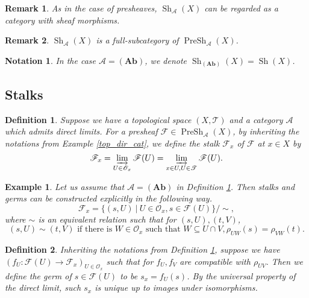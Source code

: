 \documentclass{article}
\newtheorem{definition}{Definition}[section]
\newtheorem{notation}{Notation}[section]
\newtheorem{remark}{Remark}[section]
\newtheorem{example}{Example}[section]
\numberwithin{equation}{section}
\DeclareMathOperator{\PreSh}{PreSh}
\DeclareMathOperator{\Sh}{Sh}
\begin{document}
\begin{remark}
As in the case of presheaves, $\Sh_\mathcal{A}(X)$ can be regarded as a category with sheaf morphisms.
\end{remark}

\begin{remark}
$\Sh_{\mathcal{A}}(X)$ is a full-subcategory of $\PreSh_{\mathcal{A}}(X)$.
\end{remark}

\begin{notation}
In the case $\mathcal{A}=(\mathbf{Ab})$, we denote $\Sh_{(\mathbf{Ab})}(X) = \Sh(X)$. 
\end{notation}

\subsection{Stalks}

\begin{definition}
\label{def_stalk}
Suppose we have a topological space $(X,\mathcal{T})$ and a category $\mathcal{A}$ which admits direct limits. For a presheaf $\mathcal{F}\in\PreSh_{\mathcal{A}}(X)$, by inheriting the notations from Example \ref{top_dir_cat}, we define the stalk $\mathcal{F}_x$ of $\mathcal{F}$ at $x\in X$ by
\begin{equation*}
\mathcal{F}_x = \varinjlim_{U\in\mathcal{O}_x}\mathcal{F}(U) =  \varinjlim_{x\in U,U\in\mathcal{T}}\mathcal{F}(U).
\end{equation*}
\end{definition}

\begin{example}
\label{stalk_ex1}
Let us assume that $\mathcal{A}=(\mathbf{Ab})$ in Definition \ref{def_stalk}. Then stalks and germs can be constructed explicitly in the following way.
\begin{equation*}
\mathcal{F}_x = \{(s,U)\:|\: U\in\mathcal{O}_x, s\in\mathcal{F}(U)\}/\sim,
\end{equation*}
where $\sim$ is an equivalent relation such that for $(s,U),(t,V)$,
\begin{equation*}
(s,U)\sim(t,V) \text{ if there is } W\in\mathcal{O}_x \text{ such that } W\subseteq U\cap V, \rho_{UW}(s)=\rho_{VW}(t).
\end{equation*}
\end{example}

\begin{definition}
Inheriting the notations from Definition \ref{def_stalk}, suppose we have $(f_U:\mathcal{F}(U)\to\mathcal{F}_x)_{U\in\mathcal{O}_x}$ such that for $f_U, f_V$ are compatible with $\rho_{UV}$. Then we define the germ of $s\in\mathcal{F}(U)$ to be $s_x=f_U(s)$. By the universal property of the direct limit, such $s_x$ is unique up to images under isomorphisms.
\end{definition}
\end{document}
